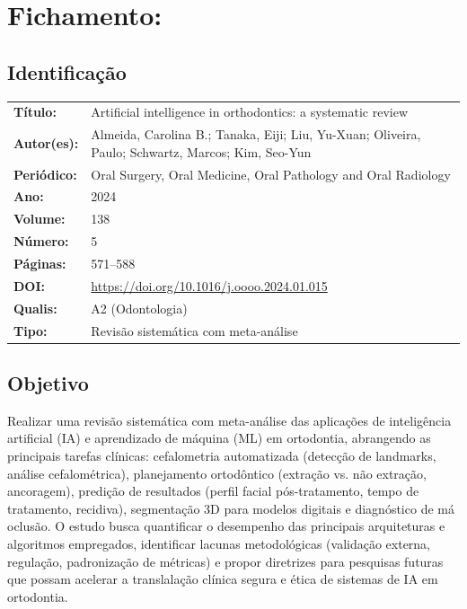 \section{Fichamento: }

\subsection{Identificação}
\begin{tabular}{ll}
\textbf{Título:} & Artificial intelligence in orthodontics: a systematic
review \\
\textbf{Autor(es):} & Almeida, Carolina B.; Tanaka, Eiji; Liu, Yu-Xuan;
Oliveira, Paulo; Schwartz, Marcos; Kim, Seo-Yun \\
\textbf{Periódico:} & Oral Surgery, Oral Medicine, Oral Pathology and Oral Radiology \\
\textbf{Ano:} & 2024 \\
\textbf{Volume:} & 138 \\
\textbf{Número:} & 5 \\
\textbf{Páginas:} & 571--588 \\
\textbf{DOI:} & \url{https://doi.org/10.1016/j.oooo.2024.01.015} \\
\textbf{Qualis:} & A2 (Odontologia) \\
\textbf{Tipo:} & Revisão sistemática com meta-análise \\
\end{tabular}

\subsection{Objetivo}
Realizar uma revisão sistemática com meta-análise das aplicações de
inteligência artificial (IA) e aprendizado de máquina (ML) em
ortodontia, abrangendo as principais tarefas clínicas: cefalometria
automatizada (detecção de landmarks, análise cefalométrica),
planejamento ortodôntico (extração vs. não extração, ancoragem),
predição de resultados (perfil facial pós-tratamento, tempo de
tratamento, recidiva), segmentação 3D para modelos digitais e
diagnóstico de má oclusão. O estudo busca quantificar o desempenho
das principais arquiteturas e algoritmos empregados, identificar
lacunas metodológicas (validação externa, regulação, padronização
de métricas) e propor diretrizes para pesquisas futuras que possam
acelerar a translalação clínica segura e ética de sistemas de IA
em ortodontia.

